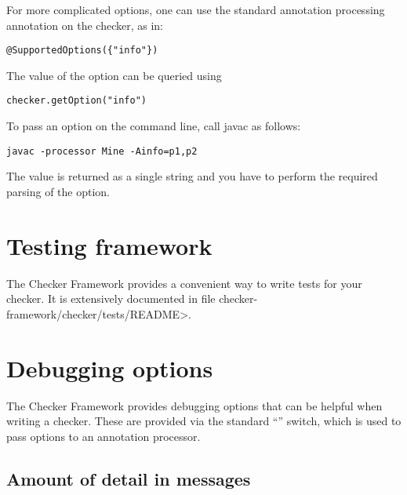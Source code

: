 For more complicated options, one can use the standard annotation
processing  annotation on the checker, as in:

\begin{Verbatim}
@SupportedOptions({"info"})
\end{Verbatim}

The value of the option can be queried using

\begin{Verbatim}
checker.getOption("info")
\end{Verbatim}

To pass an option on the command line, call javac as follows:

\begin{Verbatim}
javac -processor Mine -Ainfo=p1,p2
\end{Verbatim}

The value is returned as a single string and you have to perform the
required parsing of the option.





\section{Testing framework\label{testing-framework}}

The Checker Framework provides a convenient way to write tests for your
checker.
It is extensively documented in file \<checker-framework/checker/tests/README>.


\section{Debugging options\label{debugging-options}}

The Checker Framework provides debugging options that can be helpful when
writing a checker. These are provided via the standard  ``''
switch, which is used to pass options to an annotation processor.

\subsection{Amount of detail in messages\label{debugging-options-detail}}

